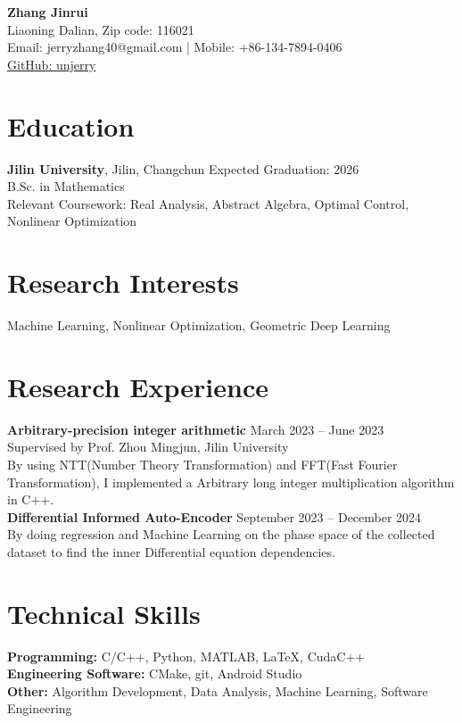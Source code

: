 \documentclass[a4paper,10pt]{article}
\begin{document}
\begin{center}
    {\LARGE \textbf{Zhang Jinrui}}\\
    Liaoning Dalian, Zip code: 116021 \\
    Email: jerryzhang40@gmail.com | Mobile: +86-134-7894-0406 \\
    \href{https://github.com/unjerry}{GitHub: unjerry}
\end{center}

\section*{Education}
\textbf{Jilin University}, Jilin, Changchun  \hfill Expected Graduation: 2026  \\
B.Sc. in Mathematics \\
Relevant Coursework: Real Analysis, Abstract Algebra, Optimal Control, Nonlinear Optimization

\section*{Research Interests}
Machine Learning, Nonlinear Optimization, Geometric Deep Learning

\section*{Research Experience}
\textbf{Arbitrary-precision integer arithmetic} \hfill March 2023 – June 2023  \\
Supervised by Prof. Zhou Mingjun, Jilin University  \\
By using NTT(Number Theory Transformation) and FFT(Fast Fourier Transformation),
I implemented a Arbitrary long integer multiplication algorithm
in C++\cite{firstApproachGithubProject}.
\\
\textbf{Differential Informed Auto-Encoder} \hfill September 2023 – December 2024  \\
By doing regression and Machine Learning on the phase space of
the collected dataset to find the inner Differential
equation dependencies.\cite{zhang2024differentialinformedautoencoder}

\section*{Technical Skills}
\textbf{Programming:} C/C++, Python, MATLAB, LaTeX, CudaC++  \\
\textbf{Engineering Software:} CMake, git, Android Studio \\
\textbf{Other:} Algorithm Development, Data Analysis, Machine Learning, Software Engineering
\end{document}
